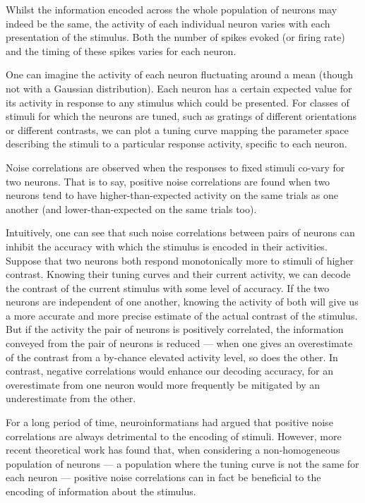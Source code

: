 Whilst the information encoded across the whole population of neurons may indeed be the same, the activity of each individual neuron varies with each presentation of the stimulus. Both the number of spikes evoked (or firing rate) and the timing of these spikes varies for each neuron. 

One can imagine the activity of each neuron fluctuating around a mean (though not with a Gaussian distribution). Each neuron has a certain expected value for its activity in response to any stimulus which could be presented. For classes of stimuli for which the neurons are tuned, such as gratings of different orientations or different contrasts, we can plot a tuning curve mapping the parameter space describing the stimuli to a particular response activity, specific to each neuron.

Noise correlations are observed when the responses to fixed stimuli co-vary for two neurons. That is to say, positive noise correlations are found when two neurons tend to have higher-than-expected activity on the same trials as one another (and lower-than-expected on the same trials too).

Intuitively, one can see that such noise correlations between pairs of neurons can inhibit the accuracy with which the stimulus is encoded in their activities. Suppose that two neurons both respond monotonically more to stimuli of higher contrast. Knowing their tuning curves and their current activity, we can decode the contrast of the current stimulus with some level of accuracy. If the two neurons are independent of one another, knowing the activity of both will give us a more accurate and more precise estimate of the actual contrast of the stimulus. But if the activity the pair of neurons is positively correlated, the information conveyed from the pair of neurons is reduced --- when one gives an overestimate of the contrast from a by-chance elevated activity level, so does the other. In contrast, negative correlations would enhance our decoding accuracy, for an overestimate from one neuron would more frequently be mitigated by an underestimate from the other.

For a long period of time, neuroinformatians had argued that positive noise correlations are always detrimental to the encoding of stimuli. However, more recent theoretical work has found that, when considering a non-homogeneous population of neurons --- a population where the tuning curve is not the same for each neuron --- positive noise correlations can in fact be beneficial to the encoding of information about the stimulus.

